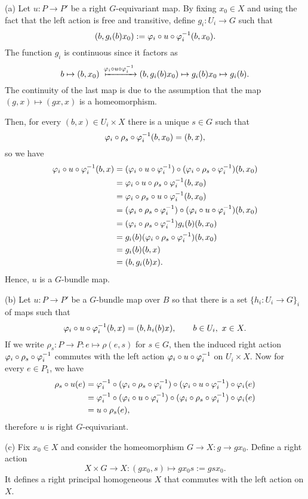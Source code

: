 \documentclass{../../large}
\begin{document}
\begin{pf}
(a)
Let $u:P\to P'$ be a right $G$-equivariant map.
By fixing $x_0\in X$ and using the fact that the left action is free and transitive, define $g_i:U_i\to G$ such that
\[(b,g_i(b)x_0):=\varphi_i\circ u\circ\varphi_i^{-1}(b,x_0).\]
The function $g_i$ is continuous since it factors as
\[b\mapsto(b,x_0)\xmapsto{\f_i\circ u\circ\f_i^{-1}}(b,g_i(b)x_0)\mapsto g_i(b)x_0\mapsto g_i(b).\]
The continuity of the last map is due to the assumption that the map $(g,x)\mapsto(gx,x)$ is a homeomorphism.

Then, for every $(b,x)\in U_i\times X$ there is a unique $s\in G$ such that
\[\varphi_i\circ\rho_s\circ\varphi_i^{-1}(b,x_0)=(b,x),\]
so we have
\begin{align*}
\varphi_i\circ u\circ\varphi_i^{-1}(b,x)
&=(\varphi_i\circ u\circ\varphi_i^{-1})\circ(\varphi_i\circ\rho_s\circ\varphi_i^{-1})(b,x_0)\\
&=\varphi_i\circ u\circ\rho_s\circ\varphi_i^{-1}(b,x_0)\\
&=\varphi_i\circ\rho_s\circ u\circ\varphi_i^{-1}(b,x_0)\\
&=(\varphi_i\circ\rho_s\circ\varphi_i^{-1})\circ(\varphi_i\circ u\circ\varphi_i^{-1})(b,x_0)\\
&=(\varphi_i\circ\rho_s\circ\varphi_i^{-1})g_i(b)(b,x_0)\\
&=g_i(b)(\varphi_i\circ\rho_s\circ\varphi_i^{-1})(b,x_0)\\
&=g_i(b)(b,x)\\
&=(b,g_i(b)x).
\end{align*}
Hence, $u$ is a $G$-bundle map.

(b)
Let $u:P\to P'$ be a $G$-bundle map over $B$ so that there is a set $\{h_i:U_i\to G\}_i$ of maps such that
\[\varphi_i\circ u\circ\varphi_i^{-1}(b,x)=(b,h_i(b)x),
\qquad b\in U_i,\ x\in X.\]
If we write $\rho_s:P\to P:e\mapsto \rho(e,s)$ for $s\in G$, then the induced right action $\varphi_i\circ\rho_s\circ\varphi_i^{-1}$ commutes with the left action $\varphi_i\circ u\circ\varphi_i^{-1}$ on $U_i\times X$.
Now for every $e\in P_1$, we have
\begin{align*}
\rho_s\circ u(e)
&=\varphi_i^{-1}\circ(\varphi_i\circ\rho_s\circ\varphi_i^{-1})\circ(\varphi_i\circ u\circ\varphi_i^{-1})\circ\varphi_i(e)\\
&=\varphi_i^{-1}\circ(\varphi_i\circ u\circ\varphi_i^{-1})\circ(\varphi_i\circ\rho_s\circ\varphi_i^{-1})\circ\varphi_i(e)\\
&=u\circ\rho_s(e),
\end{align*}
therefore $u$ is right $G$-equivariant.


(c)
Fix $x_0\in X$ and consider the homeomorphism $G\to X:g\to gx_0$.
Define a right action
\[X\times G\to X:(gx_0,s)\mapsto gx_0s:=gsx_0.\]
It defines a right principal homogeneous $X$ that commutes with the left action on $X$.


\end{pf}
\end{document}
